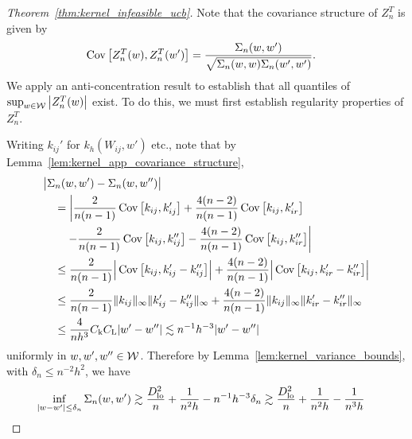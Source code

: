 \begin{proof}[Theorem~\ref{thm:kernel_infeasible_ucb}]

  Note that the covariance structure of $Z_n^T$ is given by
  \begin{align*}
    \operatorname{Cov}\big[
      Z_n^T(w),
      Z_n^T(w')
    \big]
    &=
    \frac{\Sigma_n(w,w')}
    {\sqrt{\Sigma_n(w,w) \Sigma_n(w',w')}}.
  \end{align*}
  We apply an anti-concentration result
  to establish that all quantiles of
  $\sup_{w \in \mathcal{W}} \big|Z_n^T(w)\big|$ exist.
  To do this, we must first establish regularity
  properties of $Z_n^T$.


  Writing $k_{i j}'$
  for $k_h(W_{i j},w')$ etc.,
  note that by Lemma~\ref{lem:kernel_app_covariance_structure},
  \begin{align*}
    &\big|
    \Sigma_n(w,w')
    -
    \Sigma_n(w, w'')
    \big| \\
    &\quad=
    \left|
    \frac{2}{n(n-1)}
    \operatorname{Cov}\big[
      k_{i j},
      k_{i j}'
    \big]
    +
    \frac{4(n-2)}{n(n-1)}
    \operatorname{Cov}\big[
      k_{i j},
      k_{i r}'
    \big]
    \right. \\
    &\left.
    \qquad-
    \frac{2}{n(n-1)}
    \operatorname{Cov}\big[
      k_{i j},
      k_{i j}''
    \big]
    -
    \frac{4(n-2)}{n(n-1)}
    \operatorname{Cov}\big[
      k_{i j},
      k_{i r}''
    \big]
    \right| \\
    &\quad\leq
    \frac{2}{n(n-1)}
    \Big|
    \operatorname{Cov}\big[
      k_{i j},
      k_{i j}' - k_{i j}''
    \big]
    \Big|
    +
    \frac{4(n-2)}{n(n-1)}
    \Big|
    \operatorname{Cov}\big[
      k_{i j},
      k_{i r}' - k_{i r}''
    \big]
    \Big| \\
    &\quad\leq
    \frac{2}{n(n-1)}
    \|k_{i j}\|_\infty
    \|k_{i j}' - k_{i j}''\|_\infty
    +
    \frac{4(n-2)}{n(n-1)}
    \|k_{i j}\|_\infty
    \|k_{i r}' - k_{i r}''\|_\infty \\
    &\quad\leq
    \frac{4}{n h^3}
    C_{\mathrm{k}} C_{\mathrm{L}}
    |w'-w''|
    \lesssim
    n^{-1}h^{-3} |w'-w''|
  \end{align*}
  uniformly in $w, w', w'' \in \mathcal{W}$.
  Therefore by Lemma~\ref{lem:kernel_variance_bounds},
  with $\delta_n \leq n^{-2} h^2$,
  we have
  \begin{align*}
    \inf_{|w-w'| \leq \delta_n}
    \Sigma_n(w,w')
    &\gtrsim
    \frac{\Dl^2}{n}
    + \frac{1}{n^2h}
    - n^{-1} h^{-3} \delta_n
    \gtrsim
    \frac{\Dl^2}{n}
    + \frac{1}{n^2h}
    - \frac{1}{n^3h}

\end{align*}
\end{proof}
